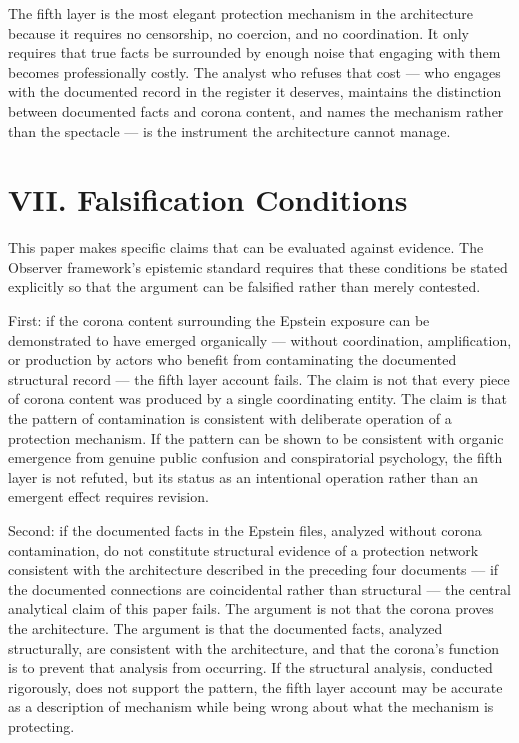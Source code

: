 \documentclass[11pt,a4paper]{article}
\begin{document}
The fifth layer is the most elegant protection mechanism in the architecture because it requires no censorship, no coercion, and no coordination. It only requires that true facts be surrounded by enough noise that engaging with them becomes professionally costly. The analyst who refuses that cost — who engages with the documented record in the register it deserves, maintains the distinction between documented facts and corona content, and names the mechanism rather than the spectacle — is the instrument the architecture cannot manage.


\section{VII. Falsification Conditions}

This paper makes specific claims that can be evaluated against evidence. The Observer framework's epistemic standard requires that these conditions be stated explicitly so that the argument can be falsified rather than merely contested.


First: if the corona content surrounding the Epstein exposure can be demonstrated to have emerged organically — without coordination, amplification, or production by actors who benefit from contaminating the documented structural record — the fifth layer account fails. The claim is not that every piece of corona content was produced by a single coordinating entity. The claim is that the pattern of contamination is consistent with deliberate operation of a protection mechanism. If the pattern can be shown to be consistent with organic emergence from genuine public confusion and conspiratorial psychology, the fifth layer is not refuted, but its status as an intentional operation rather than an emergent effect requires revision.


Second: if the documented facts in the Epstein files, analyzed without corona contamination, do not constitute structural evidence of a protection network consistent with the architecture described in the preceding four documents — if the documented connections are coincidental rather than structural — the central analytical claim of this paper fails. The argument is not that the corona proves the architecture. The argument is that the documented facts, analyzed structurally, are consistent with the architecture, and that the corona's function is to prevent that analysis from occurring. If the structural analysis, conducted rigorously, does not support the pattern, the fifth layer account may be accurate as a description of mechanism while being wrong about what the mechanism is protecting.
\end{document}
